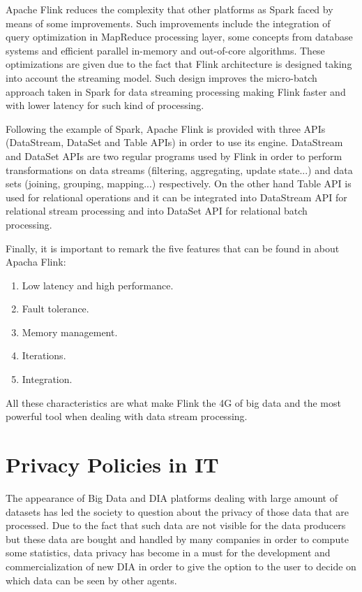 Apache Flink reduces the complexity that other platforms as Spark faced by means of some improvements. Such improvements include the integration of query optimization in MapReduce processing layer, some concepts from database systems and efficient parallel in-memory and out-of-core algorithms. These optimizations are given due to the fact that Flink architecture is designed taking into account the streaming model. Such design improves the micro-batch approach taken in Spark for data streaming processing making Flink faster and with lower latency for such kind of processing.

Following the example of Spark, Apache Flink is provided with three APIs (DataStream, DataSet and Table APIs) in order to use its engine. DataStream and DataSet APIs are two regular programs used by Flink in order to perform transformations on data streams (filtering, aggregating, update state...) and data sets (joining, grouping, mapping...) respectively. On the other hand Table API is used for relational operations and it can be integrated into DataStream API for relational stream processing and into DataSet API for relational batch processing.

Finally, it is important to remark the five features that can be found in \cite{flinkwebsite} about Apacha Flink:

\begin{enumerate}

\item Low latency and high performance.
\item Fault tolerance.
\item Memory management.
\item Iterations.
\item Integration.

\end{enumerate}

All these characteristics are what make Flink the 4G of big data and the most powerful tool when dealing with data stream processing.

\section{Privacy Policies in IT}

\label{Privacy Policies in IT}

The appearance of Big Data and DIA platforms dealing with large amount of datasets has led the society to question about the privacy of those data that are processed. Due to the fact that such data are not visible for the data producers but these data are bought and handled by many companies in order to compute some statistics, data privacy has become in a must for the development and commercialization of new DIA in order to give the option to the user to decide on which data can be seen by other agents.

